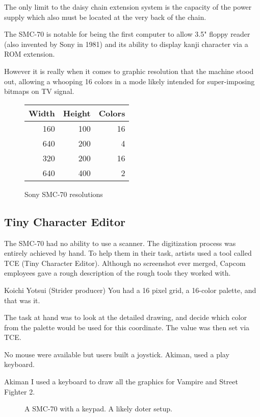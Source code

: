 % 


The only limit to the daisy chain extension system is the capacity of the power supply which also must be located at the very back of the chain. 

The SMC-70 is notable for being the first computer to allow 3.5" floppy reader (also invented by Sony in 1981) and its ability to display kanji character via a ROM extension. 

However it is really when it comes to graphic resolution that the machine stood out, allowing a whooping 16 colors in a mode likely intended for super-imposing bitmaps on TV signal.

 \begin{figure}[H]
 \center
\begin{tabularx}{0.35\textwidth}{rrr} 
  \textbf{Width} & \textbf{Height} & \textbf{Colors} \\               
  \toprule    
160& 100& 16 \\
640& 200& 4 \\
320& 200& 16 \\
640& 400& 2 \\
\toprule
\end{tabularx}%
\caption*{Sony SMC-70 resolutions}
\end{figure}


\subsection{Tiny Character Editor}

The SMC-70 had no ability to use a scanner. The digitization process was entirely achieved by hand. To help them in their task, artists used a tool called TCE (Tiny Character Editor). Although no screenshot ever merged, Capcom employees gave a rough description of the rough tools they worked with.

\begin{q}{Koichi Yotsui (Strider producer)}
You had a 16 pixel grid, a 16-color palette, and that was it.
\end{q}

The task at hand was to look at the detailed drawing, and decide which color from the palette would be used for this coordinate. The value was then set via TCE. 

No mouse were available but users built a joystick. Akiman, used a play keyboard.

\begin{q}{Akiman\cite{akiman}}
I used a keyboard to draw all the graphics for Vampire and Street Fighter 2.
\end{q}
\begin{figure}[H]
\caption*{A SMC-70 with a keypad. A likely doter setup.}
\end{figure}







